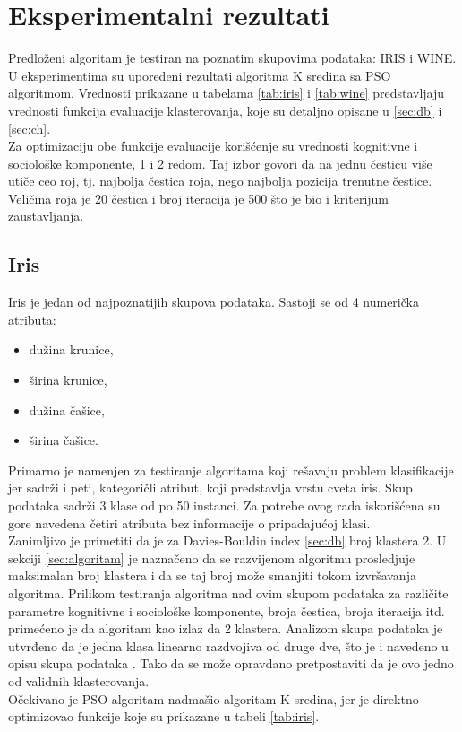 \documentclass[a4paper,serbian]{symopissr}
\begin{document}
\section{Eksperimentalni rezultati}

\label{eksperimenti}
Predloženi algoritam je testiran na poznatim skupovima podataka: IRIS i WINE. U eksperimentima su upoređeni rezultati algoritma K sredina sa PSO algoritmom. Vrednosti prikazane u tabelama \ref{tab:iris} i \ref{tab:wine} predstavljaju vrednosti funkcija evaluacije klasterovanja, koje su detaljno opisane u \ref{sec:db} i \ref{sec:ch}.\\
Za optimizaciju obe funkcije evaluacije korišćenje su vrednosti kognitivne i sociološke komponente, 1 i 2 redom. Taj izbor govori da na jednu česticu više utiče ceo roj, tj. najbolja čestica roja, nego najbolja pozicija trenutne čestice. Veličina roja je 20 čestica i broj iteracija je 500 što je bio i kriterijum zaustavljanja.

\subsection{Iris}
Iris \cite{iris} je jedan od najpoznatijih skupova podataka. Sastoji se od 4 numerička atributa:
\begin{itemize}
	\item dužina krunice,
	\item širina krunice,
	\item dužina čašice,
	\item širina čašice.
\end{itemize} Primarno je namenjen za testiranje algoritama koji rešavaju problem klasifikacije jer sadrži i peti, kategoričli atribut, koji predstavlja vrstu cveta iris. Skup podataka sadrži 3 klase od po 50 instanci. Za potrebe ovog rada iskorišćena su gore navedena četiri atributa bez informacije o pripadajućoj klasi.\\
Zanimljivo je primetiti da je za Davies-Bouldin index \ref{sec:db} broj klastera 2.
U sekciji \ref{sec:algoritam} je naznačeno da se razvijenom algoritmu prosledjuje maksimalan broj klastera i da se taj broj može smanjiti tokom izvršavanja algoritma. Prilikom testiranja algoritma nad ovim skupom podataka za različite parametre kognitivne i sociološke komponente, broja čestica, broja iteracija itd. primećeno je da algoritam kao izlaz da 2 klastera. Analizom skupa podataka je utvrđeno da je jedna klasa linearno razdvojiva od druge dve, što je i navedeno u opisu skupa podataka \cite{uci_iris}.
Tako da se može opravdano pretpostaviti da je ovo jedno od validnih klasterovanja.\\
Očekivano je PSO algoritam nadmašio algoritam K sredina, jer je direktno optimizovao funkcije koje su prikazane u tabeli \ref{tab:iris}.\\
\end{document}
